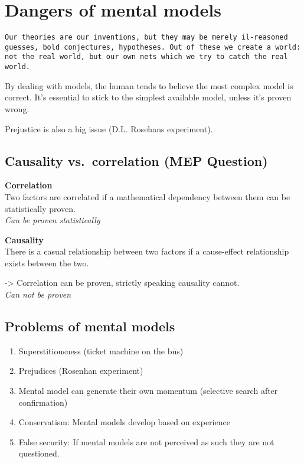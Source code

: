 \hypertarget{dangers-of-mental-models}{%
\section{Dangers of mental models}\label{dangers-of-mental-models}}

\begin{verbatim}
Our theories are our inventions, but they may be merely il-reasoned guesses, bold conjectures, hypotheses. Out of these we create a world: not the real world, but our own nets which we try to catch the real world.
\end{verbatim}

By dealing with models, the human tends to believe the most complex
model is correct. It's essential to stick to the simplest available
model, unless it's proven wrong.

Prejustice is also a big issue (D.L. Rosehans experiment).

\hypertarget{causality-vs.correlation-mep-question}{%
\subsection{Causality vs.~correlation (MEP
Question)}\label{causality-vs.correlation-mep-question}}

\textbf{Correlation}\\
Two factors are correlated if a mathematical dependency between them can
be statistically proven.\\
\emph{Can be proven statistically}

\textbf{Causality}\\
There is a casual relationship between two factors if a cause-effect
relationship exists between the two.

-\textgreater{} Correlation can be proven, strictly speaking causality
cannot.\\
\emph{Can not be proven}

\hypertarget{problems-of-mental-models}{%
\subsection{Problems of mental models}\label{problems-of-mental-models}}

\begin{enumerate}
\def\labelenumi{\arabic{enumi}.}
\tightlist
\item
  Superstitiousness (ticket machine on the bus)
\item
  Prejudices (Rosenhan experiment)
\item
  Mental model can generate their own momentum (selective search after
  confirmation)
\item
  Conservatism: Mental models develop based on experience
\item
  False security: If mental models are not perceived as such they are
  not questioned.
\end{enumerate}

